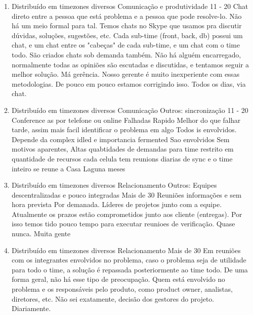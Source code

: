\begin{enumerate}
	\item
	\begin{respostas3}
		{Distribuído em timezones diversos}
		{Comunicação e produtividade}
		{11 - 20}
		{Chat direto entre a pessoa que está problema e a pessoa que pode resolve-lo.}
		{Não há um meio formal para tal. Temos chats no Skype que usamos pra discutir dúvidas, soluções, sugestões, etc. Cada sub-time (front, back, db) possui um chat, e um chat entre os "cabeças" de cada sub-time, e um chat com o time todo. São criados chats sob demanda também.}
		{Não há alguém encarregado, normalmente todas as opiniões são escutadas e discutidas, e tentamos seguir a melhor solução.}
		{Má gerência. Nosso gerente é muito inexperiente com essas metodologias. De pouco em pouco estamos corrigindo isso.}
		{Todos os dias, via chat.}
	\end{respostas3}

	\item
	\begin{respostas3}
		{Distribuído em timezones diversos}
		{Comunicação \newline Outros: sincronização}
		{11 - 20}
		{Conference as por telefone ou online}
		{Falhadas Rapido Melhor do que falhar tarde, assim mais facil identificar o problema em algo}
		{Todos is envolvidos. Depende da complex idled e importancia fermented Sao envolvidos}
		{Sem motivos aparentes, Altas quabtidades de demandas para time restrito em quantidade de recursos}
		{cada celula tem reunions diarias de sync e o time inteiro se reune a Casa Laguna meses}
	\end{respostas3}

	\item
	\begin{respostas3}
		{Distribuído em timezones diversos}
		{Relacionamento \newline Outros: Equipes descentralizadas e pouco integradas}
		{Mais de 30}
		{Reuniões informações e sem hora prevista}
		{Por demanada.}
		{Líderes de projetos junto com a equipe.}
		{Atualmente os prazos estão comprometidos junto aos cliente (entregas). Por isso temos tido pouco tempo para executar reunioes de verificação.}
		{Quase nunca. Muita gente}
	\end{respostas3}

	\item
	\begin{respostas3}
		{Distribuído em timezones diversos}
		{Relacionamento}
		{Mais de 30}
		{Em reuniões com os integrantes envolvidos no problema, caso o problema seja de utilidade para todo o time, a solução é repassada posteriormente ao time todo.}
		{De uma forma geral, não há esse tipo de preocupação.}
		{Quem está envolvido no problema e os responsáveis pelo produto, como product owner, analistas, diretores, etc.}
		{Não sei exatamente, decisão dos gestores do projeto.}
		{Diariamente.}
	\end{respostas3}


\end{enumerate}
